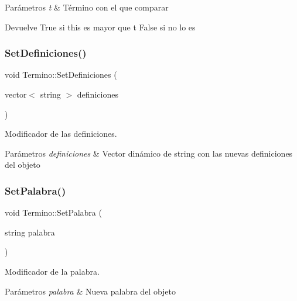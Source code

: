 \begin{DoxyParams}{Parámetros}
{\em t} & Término con el que comparar \\
\hline
\end{DoxyParams}
\begin{DoxyReturn}{Devuelve}
True si this es mayor que t False si no lo es 
\end{DoxyReturn}
\mbox{\label{classTermino_a2345118df3073c53c0722abb4b091da0}} 
\subsubsection{\texorpdfstring{Set\+Definiciones()}{SetDefiniciones()}}
{\footnotesize\ttfamily void Termino\+::\+Set\+Definiciones (\begin{DoxyParamCaption}\item[{vector$<$ string $>$}]{definiciones }\end{DoxyParamCaption})}



Modificador de las definiciones. 


\begin{DoxyParams}{Parámetros}
{\em definiciones} & Vector dinámico de string con las nuevas definiciones del objeto \\
\hline
\end{DoxyParams}
\mbox{\label{classTermino_a6d148c1d2aaaa5ebc40fc1eb6e34857a}} 
\subsubsection{\texorpdfstring{Set\+Palabra()}{SetPalabra()}}
{\footnotesize\ttfamily void Termino\+::\+Set\+Palabra (\begin{DoxyParamCaption}\item[{string}]{palabra }\end{DoxyParamCaption})}



Modificador de la palabra. 


\begin{DoxyParams}{Parámetros}
{\em palabra} & Nueva palabra del objeto \\
\hline
\end{DoxyParams}


